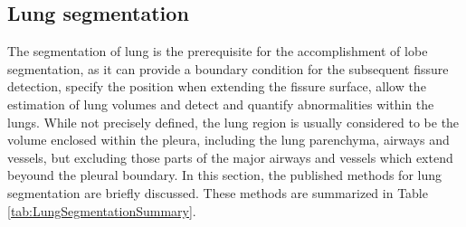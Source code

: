 \subsection{Lung segmentation}
The segmentation of lung is the prerequisite for the accomplishment of lobe segmentation, as it can provide a boundary condition for the subsequent fissure detection, specify the position when extending the fissure surface, allow the estimation of lung volumes and detect and quantify abnormalities within the lungs. While not precisely defined, the lung region is usually considered to be the volume enclosed within the pleura, including the lung parenchyma, airways and vessels, but excluding those parts of the major airways and vessels which extend beyound the pleural boundary. In this section, the published methods for lung segmentation are briefly discussed. These methods are summarized in Table \ref{tab:LungSegmentationSummary}.

